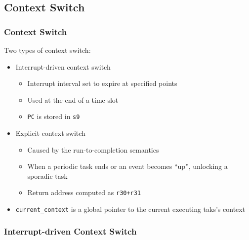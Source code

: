\documentclass[notheorems]{beamer}
\begin{document}
\subsection{Context Switch}
\begin{frame}
\frametitle{Context Switch}
Two types of context switch:
\begin{itemize}
	\item Interrupt-driven context switch
		\begin{itemize}
			\item Interrupt interval set to expire at specified points
			\item Used at the end of a time slot
			\item \texttt{PC} is stored in \texttt{s9}
		\end{itemize}
	\item Explicit context switch
		\begin{itemize}
			\item Caused by the run-to-completion semantics
			\item When a periodic task ends or an event becomes ``up'', unlocking a sporadic task
			\item Return address computed as \texttt{r30+r31}
		\end{itemize}
	\item \texttt{current\_context} is a global pointer to the current executing taks's context
\end{itemize}
\end{frame}

\begin{frame}
\frametitle{Interrupt-driven Context Switch}

	\begin{figure}[!ht]
		\begin{center}
		\end{center}
		\label{fig:context switch flow}
	\end{figure}

\end{frame}
\end{document}
